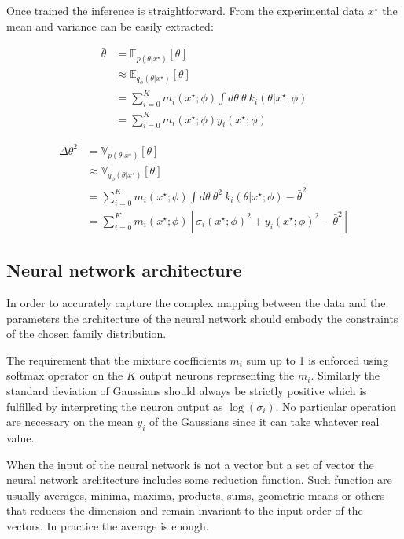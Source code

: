 Once trained the inference is straightforward.
From the experimental data $x^\star$ the mean and variance can be easily extracted:

\begin{align}
    \bar \theta & = \mathbb E_{p(\theta | x^\star)}[\theta] \\
    & \approx \mathbb E_{q_\phi(\theta | x^\star)}[\theta] \\
    & = \sum_{i=0}^K m_i(x^\star ; \phi) \int d\theta ~ \theta ~ k_i(\theta | x^\star ; \phi) \\
    & = \sum_{i=0}^K m_i(x^\star ; \phi) y_i(x^\star ; \phi)
\end{align}

\begin{align}
    \Delta\theta^2 & = \mathbb V_{p(\theta | x^\star)}[\theta] \\
    & \approx \mathbb V_{q_\phi(\theta | x^\star)}[\theta] \\
    & = \sum_{i=0}^K m_i(x^\star ; \phi) \int d\theta ~ \theta^2 ~ k_i(\theta | x^\star ; \phi) - \bar \theta^2 \\
    & = \sum_{i=0}^K m_i(x^\star ; \phi) \left [ \sigma_i(x^\star ; \phi)^2 + y_i(x^\star ; \phi)^2 - \bar \theta^2 \right ]
\end{align}

\subsection{Neural network architecture}

In order to accurately capture the complex mapping between the data and the parameters the architecture of the neural network should embody the constraints of the chosen family distribution.

The requirement that the mixture coefficients $m_i$ sum up to 1 is enforced using softmax operator on the $K$ output neurons representing the $m_i$.
Similarly the standard deviation of Gaussians should always be strictly positive which is fulfilled by interpreting the neuron output as $\log(\sigma_i)$.
No particular operation are necessary on the mean $y_i$ of the Gaussians since it can take whatever real value.

When the input of the neural network is not a vector but a set of vector the neural network architecture includes some reduction function.
Such function are usually averages, minima, maxima, products, sums, geometric means or others that reduces the dimension and remain invariant to the input order of the vectors.
In practice the average is enough.

